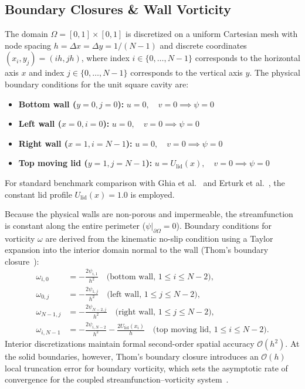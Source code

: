 \documentclass[11pt,a4paper]{article}
\begin{document}
\subsection{Boundary Closures \& Wall Vorticity}
\label{sec:boundary_conditions}
The domain $\Omega = [0, 1] \times [0, 1]$ is discretized on a uniform Cartesian mesh with node spacing $h = \Delta x = \Delta y = 1/(N-1)$ and discrete coordinates $(x_i, y_j) = (i h, j h)$, where index $i \in \{0, \dots, N-1\}$ corresponds to the horizontal axis $x$ and index $j \in \{0, \dots, N-1\}$ corresponds to the vertical axis $y$. The physical boundary conditions for the unit square cavity are:
\begin{itemize}
    \item \textbf{Bottom wall ($y = 0, j = 0$):} $u = 0, \quad v = 0 \implies \psi = 0$
    \item \textbf{Left wall ($x = 0, i = 0$):} $u = 0, \quad v = 0 \implies \psi = 0$
    \item \textbf{Right wall ($x = 1, i = N-1$):} $u = 0, \quad v = 0 \implies \psi = 0$
    \item \textbf{Top moving lid ($y = 1, j = N-1$):} $u = U_{\text{lid}}(x), \quad v = 0 \implies \psi = 0$
\end{itemize}
For standard benchmark comparison with Ghia et al.~\cite{ghia1982high} and Erturk et al.~\cite{erturk2005numerical}, the constant lid profile $U_{\text{lid}}(x) = 1.0$ is employed.

Because the physical walls are non-porous and impermeable, the streamfunction is constant along the entire perimeter ($\psi|_{\partial \Omega} = 0$). Boundary conditions for vorticity $\omega$ are derived from the kinematic no-slip condition using a Taylor expansion into the interior domain normal to the wall (Thom's boundary closure~\cite{thom1933flow}):
\begin{align}
    \omega_{i, 0} &= -\frac{2 \psi_{i, 1}}{h^2} \quad \text{(bottom wall, } 1 \le i \le N-2\text{)}, \\
    \omega_{0, j} &= -\frac{2 \psi_{1, j}}{h^2} \quad \text{(left wall, } 1 \le j \le N-2\text{)}, \\
    \omega_{N-1, j} &= -\frac{2 \psi_{N-2, j}}{h^2} \quad \text{(right wall, } 1 \le j \le N-2\text{)}, \\
    \omega_{i, N-1} &= -\frac{2 \psi_{i, N-2}}{h^2} - \frac{2 U_{\text{lid}}(x_i)}{h} \quad \text{(top moving lid, } 1 \le i \le N-2\text{)}.
\end{align}
Interior discretizations maintain formal second-order spatial accuracy $\mathcal{O}(h^2)$. At the solid boundaries, however, Thom's boundary closure introduces an $\mathcal{O}(h)$ local truncation error for boundary vorticity, which sets the asymptotic rate of convergence for the coupled streamfunction--vorticity system~\cite{thom1933flow,roache1998verification}. 
\end{document}
